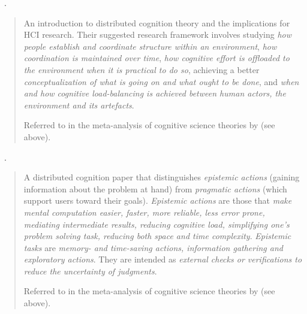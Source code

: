
\begin{sloppypar}
~\cite{Hollan2000}. \end{sloppypar}

\begin{quotation}
    An introduction to distributed cognition theory and the implications for \ac{HCI} research.
    Their suggested research framework involves studying {\it how people establish and coordinate structure within an environment}, {\it how coordination is maintained over time}, {\it how cognitive effort is offloaded to the environment when it is practical to do so}, achieving a better {\it conceptualization of what is going on and what ought to be done}, and {\it when and how cognitive load-balancing is achieved between human actors, the environment and its artefacts}.
    
    Referred to in the meta-analysis of cognitive science theories by \citet{Pohl2012} (see above).
\end{quotation}

\begin{sloppypar}
~\cite{Kirsh1994}. \end{sloppypar}

\begin{quotation}
    \begin{sloppypar}
    A distributed cognition paper that distinguishes {\it epistemic actions} (gaining information about the problem at hand) from {\it pragmatic actions} (which support users toward their goals).
    {\it Epistemic actions} are those that {\it make mental computation easier, faster, more reliable, less error prone, mediating intermediate results, reducing cognitive load, simplifying one's problem solving task, reducing both space and time complexity}. 
    {\it Epistemic tasks} are {\it memory- and time-saving actions, information gathering and exploratory actions}. 
    They are intended as {\it external checks or verifications to reduce the uncertainty of judgments}.
    \end{sloppypar}
    
    Referred to in the meta-analysis of cognitive science theories by \citet{Pohl2012} (see above).
\end{quotation}


